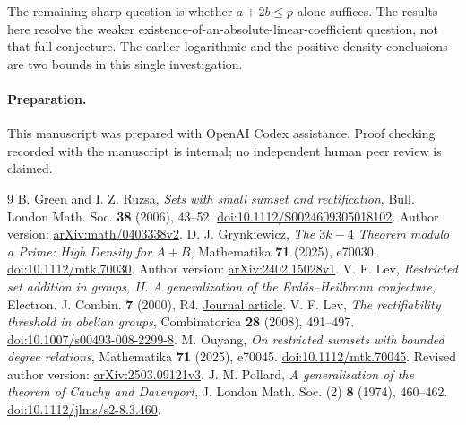 \documentclass[11pt]{article}
\theoremstyle{remark}
\begin{document}
The remaining sharp question is whether $a+2b\le p$ alone suffices. The results here resolve the weaker existence-of-an-absolute-linear-coefficient question, not that full conjecture. The earlier logarithmic and the positive-density conclusions are two bounds in this single investigation.

\paragraph{Preparation.} This manuscript was prepared with OpenAI Codex assistance. Proof checking recorded with the manuscript is internal; no independent human peer review is claimed.

\begin{thebibliography}{9}
 B. Green and I. Z. Ruzsa, \emph{Sets with small sumset and rectification}, Bull. London Math. Soc. \textbf{38} (2006), 43--52. \href{https://doi.org/10.1112/S0024609305018102}{doi:10.1112/S0024609305018102}. Author version: \href{https://arxiv.org/abs/math/0403338}{arXiv:math/0403338v2}.
 D. J. Grynkiewicz, \emph{The $3k-4$ Theorem modulo a Prime: High Density for $A+B$}, Mathematika \textbf{71} (2025), e70030. \href{https://doi.org/10.1112/mtk.70030}{doi:10.1112/mtk.70030}. Author version: \href{https://arxiv.org/abs/2402.15028}{arXiv:2402.15028v1}.
 V. F. Lev, \emph{Restricted set addition in groups, II. A generalization of the Erd\H{o}s--Heilbronn conjecture}, Electron. J. Combin. \textbf{7} (2000), R4. \href{https://www.combinatorics.org/ojs/index.php/eljc/article/view/v7i1r4}{Journal article}.
 V. F. Lev, \emph{The rectifiability threshold in abelian groups}, Combinatorica \textbf{28} (2008), 491--497. \href{https://doi.org/10.1007/s00493-008-2299-8}{doi:10.1007/s00493-008-2299-8}.
 M. Ouyang, \emph{On restricted sumsets with bounded degree relations}, Mathematika \textbf{71} (2025), e70045. \href{https://doi.org/10.1112/mtk.70045}{doi:10.1112/mtk.70045}. Revised author version: \href{https://arxiv.org/abs/2503.09121v3}{arXiv:2503.09121v3}.
 J. M. Pollard, \emph{A generalisation of the theorem of Cauchy and Davenport}, J. London Math. Soc. (2) \textbf{8} (1974), 460--462. \href{https://doi.org/10.1112/jlms/s2-8.3.460}{doi:10.1112/jlms/s2-8.3.460}.
\end{thebibliography}
\end{document}
